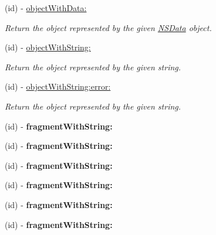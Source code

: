 \begin{DoxyCompactItemize}
(id) -\/ \hyperlink{interface_s_b_json_parser_a66d7be591cdf0d9ee85c21c863ef5cbf}{object\-With\-Data\-:}
\begin{DoxyCompactList}\small\item\em \-Return the object represented by the given \hyperlink{class_n_s_data}{\-N\-S\-Data} object. \end{DoxyCompactList}\item 
(id) -\/ \hyperlink{interface_s_b_json_parser_a1ec40b986576044d58d30172b141c74c}{object\-With\-String\-:}
\begin{DoxyCompactList}\small\item\em \-Return the object represented by the given string. \end{DoxyCompactList}\item 
(id) -\/ \hyperlink{interface_s_b_json_parser_a7a7fff47f41a08fa0defc4f628846e15}{object\-With\-String\-:error\-:}
\begin{DoxyCompactList}\small\item\em \-Return the object represented by the given string. \end{DoxyCompactList}\item 
\hypertarget{interface_s_b_json_parser_af19e33c5d77f71c4a172661545bb2299}{
(id) -\/ {\bfseries fragment\-With\-String\-:}}
\label{interface_s_b_json_parser_af19e33c5d77f71c4a172661545bb2299}

\item 
\hypertarget{interface_s_b_json_parser_af19e33c5d77f71c4a172661545bb2299}{
(id) -\/ {\bfseries fragment\-With\-String\-:}}
\label{interface_s_b_json_parser_af19e33c5d77f71c4a172661545bb2299}

\item 
\hypertarget{interface_s_b_json_parser_af19e33c5d77f71c4a172661545bb2299}{
(id) -\/ {\bfseries fragment\-With\-String\-:}}
\label{interface_s_b_json_parser_af19e33c5d77f71c4a172661545bb2299}

\item 
\hypertarget{interface_s_b_json_parser_af19e33c5d77f71c4a172661545bb2299}{
(id) -\/ {\bfseries fragment\-With\-String\-:}}
\label{interface_s_b_json_parser_af19e33c5d77f71c4a172661545bb2299}

\item 
\hypertarget{interface_s_b_json_parser_af19e33c5d77f71c4a172661545bb2299}{
(id) -\/ {\bfseries fragment\-With\-String\-:}}
\label{interface_s_b_json_parser_af19e33c5d77f71c4a172661545bb2299}

\item 
\hypertarget{interface_s_b_json_parser_af19e33c5d77f71c4a172661545bb2299}{
(id) -\/ {\bfseries fragment\-With\-String\-:}}
\label{interface_s_b_json_parser_af19e33c5d77f71c4a172661545bb2299}

\end{DoxyCompactItemize}
